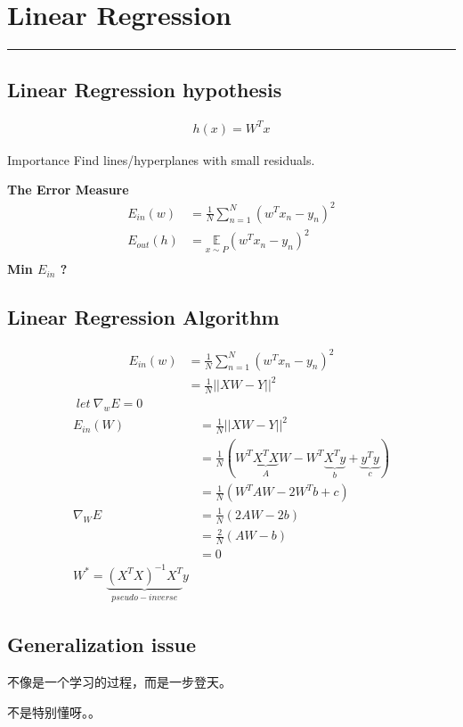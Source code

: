 \section{Linear Regression}
\noindent
{\color{LightRubineRed} \rule{\linewidth}{1mm} }
\subsection{Linear Regression hypothesis}
\begin{align*}
h(x) = W^Tx
\end{align*}
\begin{myremark}{Importance}
Find \textcolor{mypink2}{lines/hyperplanes} with small \textcolor{mypink3}{residuals}.
\end{myremark}
\textbf{The Error Measure}
\begin{align*}
E_{in}(w) &= \frac{1}{N}\sum_{n=1}^N  (w^Tx_n - y_n)^2 \\
E_{out}(h) &= \underset{x \sim P}{\mathbb{E}} (w^Tx_n - y_n)^2\\
\end{align*}
\textbf{Min $E_{in}$ ?} 
\subsection{Linear Regression Algorithm}
\begin{align*}
E_{in}(w) &= \frac{1}{N}\sum_{n=1}^N  (w^Tx_n - y_n)^2 \\
          &= \frac{1}{N} {||XW -Y||}^2
\end{align*}
\begin{align*}
\; let \ \nabla_{w}E = 0 \\
E_{in}(W) &= \frac{1}{N} {||XW -Y||}^2 \\
       &= \frac{1}{N} (W^T\underbrace{X^TX}_AW - W^T\underbrace{X^Ty}_b + \underbrace{y^Ty}_c) \\
       &= \frac{1}{N}(W^TAW - 2W^Tb + c) \\
\nabla_{W}E &= \frac{1}{N}(2AW-2b) \\
            &= \frac{2}{N}(AW-b) \\
            &= 0 \\
W^* = \underbrace{(X^TX)^{-1}X^T}_{pseudo-inverse}y
\end{align*}
\subsection{Generalization issue}
不像是一个学习的过程，而是一步登天。 \par
不是特别懂呀。。 \par

